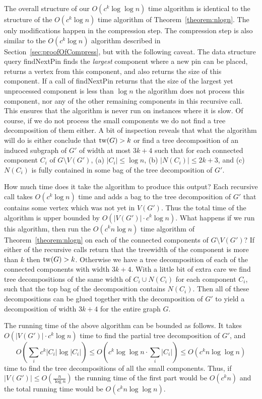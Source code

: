 \documentclass[a4paper,11pt]{article}
\theoremstyle{definition}
\theoremstyle{remark}
\newcommand{\qpin}{\textnormal{findNextPin}}
\begin{document}
The overall structure of our $O(c^k \log \log n)$ time algorithm is
identical to the structure of the $O(c^k \log n)$ time algorithm of
Theorem~\ref{theorem:nlogn}.  The only modifications happen in the
compression step.  The compression step is also similar to the $O(c^k
\log n)$ algorithm described in Section~\ref{sec:proofOfCompress}, but
with the following caveat.  The data structure query \qpin{} finds the
{\em largest} component where a new pin can be placed, returns a
vertex from this component, and also returns the size of this
component.  If a call of \qpin{} returns that the size of the largest
yet unprocessed component is less than $\log n$ the algorithm does not
process this component, nor any of the other remaining components in
this recursive call.  This ensures that the algorithm is never run on
instances where it is slow.  Of course, if we do not process the small
components we do not find a tree decomposition of them either.  A bit
of inspection reveals that what the algorithm will do is either
conclude that $\mathrm{tw}(G) > k$ or find a tree decomposition of an induced
subgraph of $G'$ of width at most $3k+4$ such that for each connected
component $C_i$ of $G \setminus V(G')$, (a) $|C_i| \leq \log n$, (b)
$|N(C_i)| \leq 2k+3$, and (c) $N(C_i)$ is fully contained in some bag
of the tree decomposition of $G'$.

How much time does it take the algorithm to produce this output? Each
recursive call takes $O(c^k \log n)$ time and adds a bag to the tree
decomposition of $G'$ that contains some vertex which was not yet in
$V(G')$.  Thus the total time of the algorithm is upper bounded by
$O(|V(G')| \cdot c^k\log n)$.  What happens if we run this algorithm,
then run the $O(c^kn \log n)$ time algorithm of
Theorem~\ref{theorem:nlogn} on each of the connected components of $G
\setminus V(G')$? If either of the recursive calls return that the
treewidth of the component is more than $k$ then $\mathrm{tw}(G) > k$.
Otherwise we have a tree decomposition of each of the connected
components with width $3k+4$.  With a little bit of extra care we find
tree decompositions of the same width of $C_i \cup N(C_i)$ for each
component $C_i$, such that the top bag of the decomposition contains
$N(C_i)$.  Then all of these decompositions can be glued together with
the decomposition of $G'$ to yield a decomposition of width $3k+4$ for
the entire graph $G$.

The running time of the above algorithm can be bounded as follows.  It
takes $O(|V(G')| \cdot c^k\log n)$ time to find the partial tree
decomposition of $G'$, and
$$O(\sum_i c^k|C_i| \log |C_i|) \leq O(c^k \log \log n \cdot \sum_i |C_i|) \leq O(c^k n \log \log n)$$ 
time to find the tree decompositions of all the small components.
Thus, if $|V(G')| \leq O(\frac{n}{\log n})$ the running time of the
first part would be $O(c^kn)$ and the total running time would be
$O(c^k n \log \log n)$.
\end{document}
